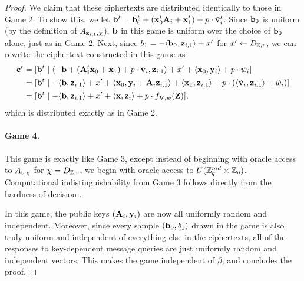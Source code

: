 \begin{proof}
  We claim that these ciphertexts are distributed identically to those
  in Game 2.  To show this, we let $\mathbf{b}^t = \mathbf{b}_0^t +
  (\mathbf{x}_{0}^{t}\mathbf{A}_{i}+\mathbf{x}_1^{t}) + p \cdot
  \tilde{\mathbf{v}}_{i}^t$.  Since $\mathbf{b}_0$ is uniform (by the
  definition of $A_{\mathbf{z}_{i,1}, \chi}$), $\mathbf{b}$ in this game is
  uniform over the choice of $\mathbf{b}_0$ alone, just as in Game 2.
  Next, since $b_{1}=-\langle{\ensuremath{\mathbf{b}}_{0}, \ensuremath{\mathbf{z}}_{i,1}}\rangle+x'$ for $x' \gets
  D_{\mathbb{Z},r}$, we can rewrite the ciphertext constructed in this game as
  \begin{align*}
    \mathbf{c}^{t} &= [\mathbf{b}^{t} \mid \langle{-\ensuremath{\mathbf{b}}+ (\ensuremath{\mathbf{A}}_i^{t}
      \ensuremath{\mathbf{x}}_{0} + \ensuremath{\mathbf{x}}_{1}) + p \cdot \tilde{\ensuremath{\mathbf{v}}}_{i}, \ensuremath{\mathbf{z}}_{i,1}}\rangle +
    x' + \langle{\ensuremath{\mathbf{x}}_{0}, \ensuremath{\mathbf{y}}_i}\rangle + p
    \cdot \tilde{w}_{i}]\\
    &= [\mathbf{b}^{t} \mid -\langle{\ensuremath{\mathbf{b}}, \ensuremath{\mathbf{z}}_{i,1}}\rangle + x' +
    \langle{\ensuremath{\mathbf{x}}_{0}, \ensuremath{\mathbf{y}}_i+\ensuremath{\mathbf{A}}_i\ensuremath{\mathbf{z}}_{i,1}}\rangle + \langle{\ensuremath{\mathbf{x}}_{1},
      \ensuremath{\mathbf{z}}_{i,1}}\rangle + p \cdot (\langle{\tilde{\ensuremath{\mathbf{v}}}_{i}, \ensuremath{\mathbf{z}}_{i,1}}\rangle+\tilde{w}_{i})]\\
    &= [\mathbf{b}^{t} \mid -\langle{\ensuremath{\mathbf{b}}, \ensuremath{\mathbf{z}}_{i,1}}\rangle + x' +
    \langle{\ensuremath{\mathbf{x}}, \ensuremath{\mathbf{z}}_i}\rangle + p \cdot f_{\mathbf{V}, w}(\mathbf{Z})],
  \end{align*}
  which is distributed exactly as in Game 2.

  \paragraph{Game 4.} This game is exactly like Game 3, except instead
  of beginning with oracle access to $A_{\mathbf{t}, \chi}$ for
  $\chi=D_{\mathbb{Z},r}$, we begin with oracle access to $U(\mathbb{Z}_q^{md} \times
  \mathbb{Z}_q)$.  Computational indistinguishability from Game 3 follows
  directly from the hardness of decision-\lwe.

  In this game, the public keys $(\mathbf{A}_i, \mathbf{y}_i)$ are now all
  uniformly random and independent.  Moreover, since every sample
  $(\mathbf{b}_0, b_1)$ drawn in the game is also truly uniform and
  independent of everything else in the ciphertexts, all of the
  responses to key-dependent message queries are just uniformly random
  and independent vectors.  This makes the game independent of
  $\beta$, and concludes the proof.
\end{proof}


